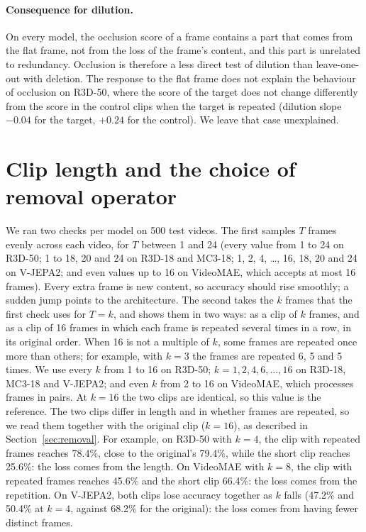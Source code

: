\paragraph{Consequence for dilution.}
On every model, the occlusion score of a frame contains a part that comes from the flat frame, not from the loss of the frame's content, and this part is unrelated to redundancy.
Occlusion is therefore a less direct test of dilution than leave-one-out with deletion.
The response to the flat frame does not explain the behaviour of occlusion on R3D-50, where the score of the target does not change differently from the score in the control clips when the target is repeated (dilution slope $-0.04$ for the target, $+0.24$ for the control).
We leave that case unexplained.

\section{Clip length and the choice of removal operator}
\label{app:length}


We ran two checks per model on 500 test videos.
The first samples $T$ frames evenly across each video, for $T$ between 1 and 24 (every value from 1 to 24 on R3D-50; 1 to 18, 20 and 24 on R3D-18 and MC3-18; 1, 2, 4, \dots, 16, 18, 20 and 24 on V-JEPA2; and even values up to 16 on VideoMAE, which accepts at most 16 frames).
Every extra frame is new content, so accuracy should rise smoothly; a sudden jump points to the architecture.
The second takes the $k$ frames that the first check uses for $T = k$, and shows them in two ways: as a clip of $k$ frames, and as a clip of 16 frames in which each frame is repeated several times in a row, in its original order. When 16 is not a multiple of $k$, some frames are repeated once more than others; for example, with $k = 3$ the frames are repeated 6, 5 and 5 times.
We use every $k$ from 1 to 16 on R3D-50; $k = 1, 2, 4, 6, \dots, 16$ on R3D-18, MC3-18 and V-JEPA2; and even $k$ from 2 to 16 on VideoMAE, which processes frames in pairs.
At $k = 16$ the two clips are identical, so this value is the reference.
The two clips differ in length and in whether frames are repeated, so we read them together with the original clip ($k = 16$), as described in Section~\ref{sec:removal}.
For example, on R3D-50 with $k = 4$, the clip with repeated frames reaches 78.4\%, close to the original's 79.4\%, while the short clip reaches 25.6\%: the loss comes from the length.
On VideoMAE with $k = 8$, the clip with repeated frames reaches 45.6\% and the short clip 66.4\%: the loss comes from the repetition.
On V-JEPA2, both clips lose accuracy together as $k$ falls (47.2\% and 50.4\% at $k = 4$, against 68.2\% for the original): the loss comes from having fewer distinct frames.

